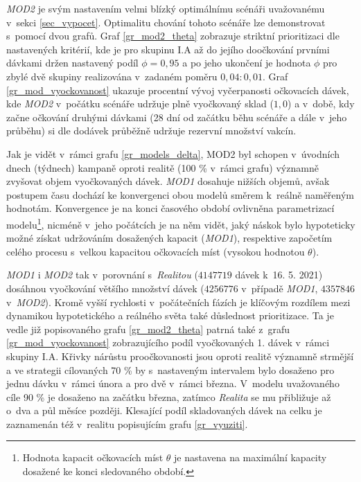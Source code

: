 \emph{MOD2} je svým nastavením velmi blízký optimálnímu scénáři uvažovanému v~sekci \ref{sec_vypocet}. Optimalitu chování tohoto scénáře lze demonstrovat s~pomocí dvou grafů. Graf \ref{gr_mod2_theta} zobrazuje striktní prioritizaci dle nastavených kritérií, kde je pro skupinu I.A až do jejího doočkování prvními dávkami držen nastavený podíl $\phi=0,95$ a po jeho ukončení je hodnota $\phi$ pro zbylé dvě skupiny realizována v~zadaném poměru $0,04:0,01$. Graf \ref{gr_mod_vyockovanost} ukazuje procentní vývoj vyčerpanosti očkovacích dávek, kde \emph{MOD2} v~počátku scénáře udržuje plně vyočkovaný sklad ($1,0$) a v~době, kdy začne očkování druhými dávkami (28 dní od začátku běhu scénáře a dále v~jeho průběhu) si dle dodávek průběžně udržuje rezervní množství vakcín.

Jak je vidět v~rámci grafu \ref{gr_models_delta}, MOD2 byl schopen v~úvodních dnech (týdnech) kampaně oproti realitě (100 \% v~rámci grafu) významně zvyšovat objem vy\-oč\-ko\-va\-ných dávek. \emph{MOD1} dosahuje nižších objemů, avšak postupem času dochází ke konvergenci obou modelů směrem k~reálně naměřeným hodnotám. Konvergence je na konci časového období ovlivněna parametrizací modelu\footnote{Hodnota kapacit očkovacích míst $\theta$ je nastavena na maximální kapacity dosažené ke konci sledovaného období.}, nicméně v~jeho počátcích je na něm vidět, jaký náskok bylo hypoteticky možné získat udržováním dosažených kapacit (\emph{MOD1}), respektive započetím celého procesu s~velkou kapacitou očkovacích míst (vysokou hodnotou $\theta$).

\emph{MOD1} i \emph{MOD2} tak v~porovnání s~\emph{Realitou} ($4 147 719$ dávek k~16. 5. 2021) dosáhnou vyočkování většího množství dávek ($4 256 776$ v~případě \emph{MOD1}, $4 357 846$ v~\emph{MOD2}). Kromě vyšší rychlosti v~počátečních fázích je klíčovým rozdílem mezi dynamikou hypotetického a reálného světa také důslednost prioritizace. Ta je vedle již popisovaného grafu \ref{gr_mod2_theta} patrná také z~grafu \ref{gr_mod_vyockovanost} zobrazujícího podíl vyočkovaných 1. dávek v~rámci skupiny I.A. Křivky nárůstu proočkovanosti jsou oproti realitě významně strmější a ve strategii cílovaných 70 \% by s~nastaveným intervalem bylo dosaženo pro jednu dávku v~rámci února a pro dvě v~rámci března. V~modelu uvažovaného cíle 90 \% je dosaženo na začátku března, zatímco \emph{Realita} se mu přibližuje až o~dva a půl měsíce později. Klesající podíl skladovaných dávek na celku je zaznamenán též v~realitu popisujícím grafu \ref{gr_vyuziti}.


